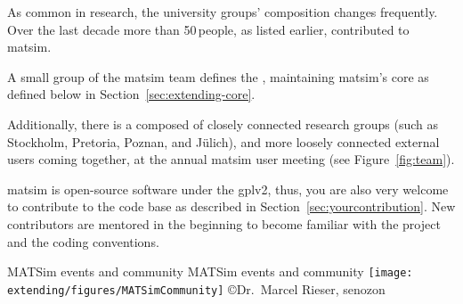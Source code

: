 As common in research, the university groups' composition changes frequently. Over the last decade more than 50\,people, as listed earlier, contributed to \gls{matsim}.

A small group of the \gls{matsim} team defines the , maintaining \gls{matsim}'s core as defined below in Section~\ref{sec:extending-core}.

Additionally, there is a  composed of closely connected research groups (such as Stockholm, Pretoria, Poznan, and Jülich),
and more loosely connected external users coming together, \eg at the annual \gls{matsim} user meeting (see Figure~\ref{fig:team}).   

\gls{matsim} is open-source software under the \gls{gplv2}, thus, you are also very welcome to contribute to the code base as described in Section~\ref{sec:yourcontribution}. New contributors are mentored in the beginning 
to become familiar with the project and the coding conventions. 

%
\createfigure%
{MATSim events and community}%
{MATSim events and community}%
{\label{fig:team}}%
{\texttt{[image: extending/figures/MATSimCommunity]}}%
{\copyright Dr.~Marcel Rieser, \gls{senozon}}

